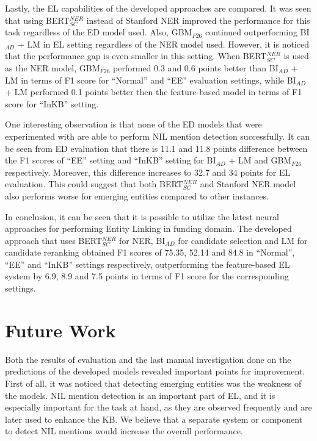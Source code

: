 \documentclass{report}
\theoremstyle{definition}
\theoremstyle{remark}
\begin{document}
Lastly, the EL capabilities of the developed approaches are compared. It was seen that using BERT$^{NER}_{SC}$ instead of Stanford NER improved the performance for this task regardless of the ED model used. Also, GBM$_{F26}$ continued outperforming BI$_{AD}$ + LM in EL setting regardless of the NER model used. However, it is noticed that the performance gap is even smaller in this setting. When BERT$^{NER}_{SC}$ is used as the NER model, GBM$_{F26}$ performed 0.3 and 0.6 points better than BI$_{AD}$ + LM in terms of F1 score for ``Normal'' and ``EE'' evaluation settings, while BI$_{AD}$ + LM performed 0.1 points better then the feature-based model in terms of F1 score for ``InKB'' setting.

One interesting observation is that none of the ED models that were experimented with are able to perform NIL mention detection successfully. It can be seen from ED evaluation that there is 11.1 and 11.8 points difference between the F1 scores of ``EE'' setting and ``InKB'' setting for BI$_{AD}$ + LM and GBM$_{F26}$ respectively. Moreover, this difference increases to 32.7 and 34 points for EL evaluation. This could suggest that both BERT$^{NER}_{SC}$ and Stanford NER model also performs worse for emerging entities compared to other instances.

In conclusion, it can be seen that it is possible to utilize the latest neural approaches for performing Entity Linking in funding domain. The developed approach that uses BERT$^{NER}_{SC}$ for NER, BI$_{AD}$ for candidate selection and LM for candidate reranking obtained F1 scores of 75.35, 52.14 and 84.8 in ``Normal'', ``EE'' and ``InKB'' settings respectively, outperforming the feature-based EL system by 6.9, 8.9 and 7.5 points in terms of F1 score for the corresponding settings.

\section{Future Work}

Both the results of evaluation and the last manual investigation done on the predictions of the developed models revealed important points for improvement. First of all, it was noticed that detecting emerging entities was the weakness of the models. NIL mention detection is an important part of EL, and it is especially important for the task at hand, as they are observed frequently and are later used to enhance the KB. We believe that a separate system or component to detect NIL mentions would increase the overall performance.
\end{document}
